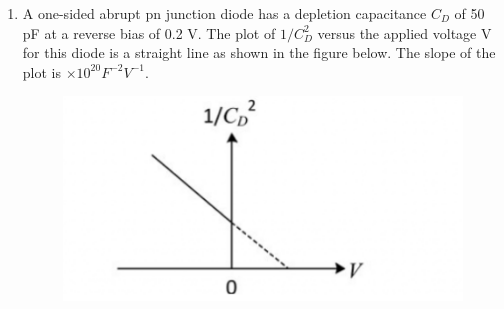 \documentclass[a4paper, 11pt]{article}
\begin{document}
\begin{enumerate}
    \item A one-sided abrupt pn junction diode has a depletion capacitance $C_D$ of 50 pF at a reverse bias of 0.2 V. The plot of $1/C_D^2$ versus the applied voltage V for this diode is a straight line as shown in the figure below. The slope of the plot is \underline{\hspace{2cm}} $\times 10^{20} F^{-2}V^{-1}$.
    \begin{figure}[H]
        \centering
        \includegraphics[width=0.3\columnwidth]{figs/Q31.png}
        \caption*{}
        \label{fig:q41}
    \end{figure}
    \begin{enumerate}
    \end{enumerate}

    \hfill{}


\end{enumerate}
\end{document}
